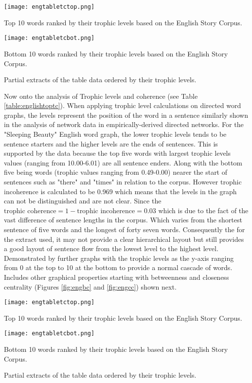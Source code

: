 \begin{table}[H]
\centering
\begin{subtable}{.45\textwidth}
	\centering
	\texttt{[image: engtabletctop.png]}
	\caption{Top 10 words ranked by their trophic levels based on the English Story Corpus.}
	\label{table:}
\end{subtable}
\hfill
\begin{subtable}{.45\textwidth}
	\centering
	\texttt{[image: engtabletcbot.png]}
	\caption{Bottom 10 words ranked by their trophic levels based on the English Story Corpus.}
	\label{table:englishtoptc}
\end{subtable}
\caption{Partial extracts of the table data ordered by their trophic levels.}
\end{table}

Now onto the analysis of Trophic levels and coherence (see Table \ref{table:englishtoptc}). When applying trophic level calculations on directed word graphs, the levels represent the position of the word in a sentence similarly shown in the analysis of network data in empirically-derived directed networks\cite{johnson2017looplessness}. For the "Sleeping Beauty" English word graph, the lower trophic levels tends to be sentence starters and the higher levels are the ends of sentences. This is supported by the data because the top five words with largest trophic levels values (ranging from 10.00-6.01) are all sentence enders. Along with the bottom five being words (trophic values ranging from 0.49-0.00) nearer the start of sentences such as "there" and "times" in relation to the corpus. However trophic incoherence is calculated to be 0.969 which means that the levels in the graph can not be distinguished and are not clear. Since the $\text{trophic coherence} = 1 - \text{trophic incoherence} = 0.03$ which is due to the fact of the vast difference of sentence lengths in the corpus. Which varies from the shortest sentence of five words and the longest of forty seven words. Consequently the for the extract used, it may not provide a clear hierarchical layout but still provides a good layout of sentence flow from the lowest level to the highest level. Demonstrated by further graphs with the trophic levels as the y-axis ranging from 0 at the top to 10 at the bottom to provide a normal cascade of words. Includes other graphical properties starting with betweenness and closeness centrality (Figures \ref{fig:engbc} and \ref{fig:engcc}) shown next.

\begin{table}[H]
\centering
\begin{subtable}{.45\textwidth}
	\centering
	\texttt{[image: engtabletctop.png]}
	\caption{Top 10 words ranked by their trophic levels based on the English Story Corpus.}
	\label{table:}
\end{subtable}
\hfill
\begin{subtable}{.45\textwidth}
	\centering
	\texttt{[image: engtabletcbot.png]}
	\caption{Bottom 10 words ranked by their trophic levels based on the English Story Corpus.}
	\label{table:englishtoptc}
\end{subtable}
\caption{Partial extracts of the table data ordered by their trophic levels.}
\end{table}

